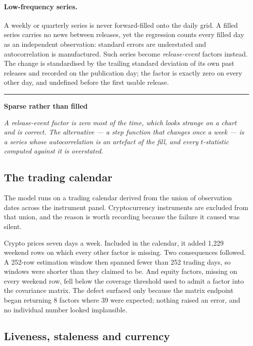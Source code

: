 \documentclass[11pt,a4paper]{article}
\newenvironment{decision}[1]
  {\par\vspace{1.7ex}%
   \begin{lrbox}{\decisionbox}\begin{minipage}{\textwidth}%
   {\color{rule}\rule{\textwidth}{0.4pt}}\par\vspace{0.7ex}
   {\small\sffamily\bfseries\color{navy}#1}\par\vspace{0.35ex}
   \small\itshape}
  {\par\vspace{0.7ex}\noindent{\color{rule}\rule{\textwidth}{0.4pt}}%
   \end{minipage}\end{lrbox}%
   \noindent\usebox{\decisionbox}\par\vspace{1.7ex}}
\begin{document}
\paragraph{Low-frequency series.} A weekly or quarterly series is never forward-filled
onto the daily grid. A filled series carries no news between releases, yet the
regression counts every filled day as an independent observation: standard errors
are understated and autocorrelation is manufactured. Such series become
\emph{release-event} factors instead. The change is standardised by the trailing
standard deviation of its own past releases and recorded on the publication day; the
factor is exactly zero on every other day, and undefined before the first usable
release.

\begin{decision}{Sparse rather than filled}
A release-event factor is zero most of the time, which looks strange on a chart and
is correct. The alternative --- a step function that changes once a week --- is a
series whose autocorrelation is an artefact of the fill, and every $t$-statistic
computed against it is overstated.
\end{decision}

\subsection{The trading calendar}

The model runs on a trading calendar derived from the union of observation dates
across the instrument panel. Cryptocurrency instruments are excluded from that union,
and the reason is worth recording because the failure it caused was silent.

Crypto prices seven days a week. Included in the calendar, it added 1{,}229 weekend
rows on which every other factor is missing. Two consequences followed. A 252-row
estimation window then spanned fewer than 252 trading days, so windows were shorter
than they claimed to be. And equity factors, missing on every weekend row, fell below
the coverage threshold used to admit a factor into the covariance matrix. The defect
surfaced only because the matrix endpoint began returning 8 factors where 39 were
expected; nothing raised an error, and no individual number looked implausible.

\subsection{Liveness, staleness and currency}
\end{document}
